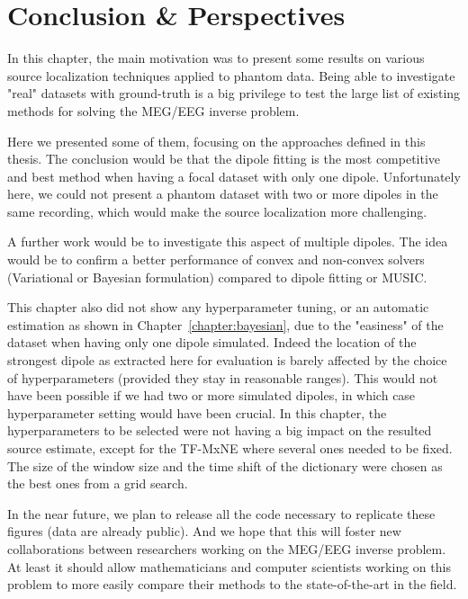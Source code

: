 \section{Conclusion \& Perspectives}
In this chapter, the main motivation was to present some results on various source localization techniques applied to phantom data. Being able to investigate "real" datasets with ground-truth is a big privilege to test the large list of existing methods for solving the MEG/EEG inverse problem.

Here we presented some of them, focusing on the approaches defined in this thesis. The conclusion would be that the dipole fitting is the most competitive and best method when having a focal dataset with only one dipole. Unfortunately here, we could not present a phantom dataset with two or more dipoles in the same recording, which would make the source localization more challenging.

A further work would be to investigate this aspect of multiple dipoles. The idea would be to confirm a better performance of convex and non-convex solvers (Variational or Bayesian formulation) compared to dipole fitting or MUSIC.

This chapter also did not show any hyperparameter tuning, or an automatic estimation as shown in Chapter~\ref{chapter:bayesian}, due to the "easiness" of the dataset when having only one dipole simulated. Indeed the location of the strongest dipole as extracted here for evaluation is barely affected by the choice of hyperparameters (provided they stay in reasonable ranges). This would not have been possible if we had two or more simulated dipoles, in which case hyperparameter setting would have been crucial. In this chapter, the hyperparameters to be selected were not having a big impact on the resulted source estimate, except for the TF-MxNE where several ones needed to be fixed. The size of the window size and the time shift of the dictionary were chosen as the best ones from a grid search.

In the near future, we plan to release all the code necessary to replicate these figures (data are already public). And we hope that this will foster new collaborations between researchers working on the MEG/EEG inverse problem. At least it should allow mathematicians and computer scientists working on this problem to more easily compare their methods to the state-of-the-art in the field.
